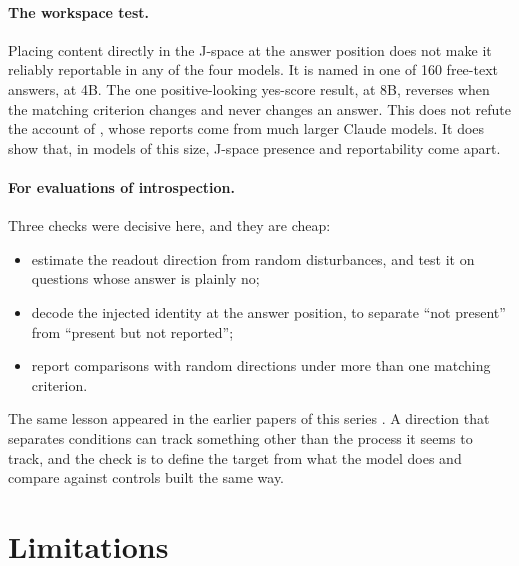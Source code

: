 \documentclass[11pt]{article}
\newcommand{\ys}{yes-score}
\begin{document}
\paragraph{The workspace test.} Placing content directly in the J-space at the answer position does not make it reliably reportable in any of the four models. It is named in one of 160 free-text answers, at 4B. The one positive-looking \ys{} result, at 8B, reverses when the matching criterion changes and never changes an answer. This does not refute the account of \citet{gurnee2026workspace}, whose reports come from much larger Claude models. It does show that, in models of this size, J-space presence and reportability come apart.

\paragraph{For evaluations of introspection.} Three checks were decisive here, and they are cheap:
\begin{itemize}
  \item estimate the readout direction from random disturbances, and test it on questions whose answer is plainly no;
  \item decode the injected identity at the answer position, to separate ``not present'' from ``present but not reported'';
  \item report comparisons with random directions under more than one matching criterion.
\end{itemize}
The same lesson appeared in the earlier papers of this series \citep{ramdan2026fingerprint,ramdan2026crv2}. A direction that separates conditions can track something other than the process it seems to track, and the check is to define the target from what the model does and compare against controls built the same way.

\section{Limitations}
\end{document}
